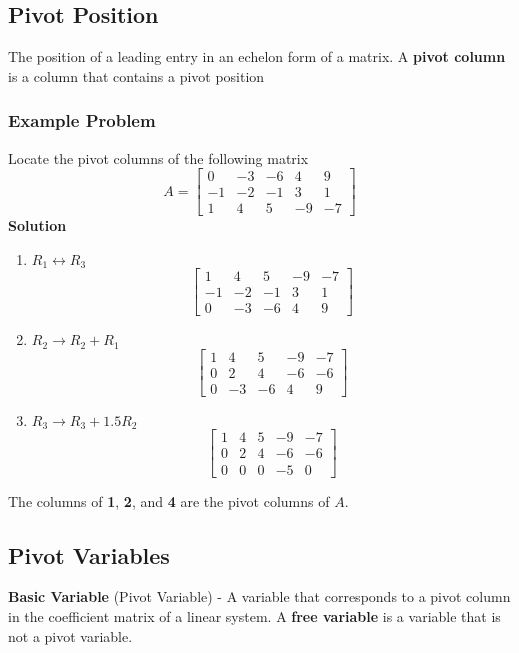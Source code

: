 \subsection{Pivot Position}
The position of a leading entry in an echelon form of a matrix. A \textbf{pivot column} is a column that contains a pivot position
\subsubsection{Example Problem}
Locate the pivot columns of the following matrix
\[
  A = \begin{bmatrix}
    0 & -3 & -6 & 4 & 9 \\
    -1 & -2 & -1 & 3 & 1 \\
    1 & 4 & 5 & -9 & -7
  \end{bmatrix}
\]
\textbf{Solution}
\begin{enumerate}
  \item $R_1 \leftrightarrow R_3$
    \[
      \begin{bmatrix}
        1 & 4 & 5 & -9 & -7 \\
        -1 & -2 & -1 & 3 & 1 \\
        0 & -3 & -6 & 4 & 9
      \end{bmatrix}
    \]
  \item $R_2 \rightarrow R_2 + R_1$
    \[
      \begin{bmatrix}
        1 & 4 & 5 & -9 & -7 \\
        0 & 2 & 4 & -6 & -6 \\
        0 & -3 & -6 & 4 & 9
      \end{bmatrix}
    \]
  \item $R_3 \rightarrow R_3 + 1.5R_2$
    \[
      \begin{bmatrix}          
        1 & 4 & 5 & -9 & -7 \\
        0 & 2 & 4 & -6 & -6 \\
        0 & 0 & 0 & -5 & 0
      \end{bmatrix}
    \]
\end{enumerate}
The columns of \textbf{1}, \textbf{2}, and \textbf{4} are the pivot columns of $A$.
\subsection{Pivot Variables}
\textbf{Basic Variable} (Pivot Variable) - A variable that corresponds to a pivot column in the coefficient matrix of a linear system. A \textbf{free variable} is a variable that is not a pivot variable. 
